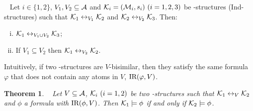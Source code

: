 \documentclass{article}
\newtheorem{theorem}{Theorem}
\begin{document}
\begin{proposition}\label{div}~\cite{renyansfirstpaper}
Let $i\in \{1,2\}$, $V_1,V_2\subseteq\cal A$
and ${\cal K}_i=({\cal M}_i,s_i)~(i=1,2,3)$ be \MPK-structures (Ind-structures)
 such that
${\cal K}_1\leftrightarrow_{V_1}{\cal K}_2$ and ${\cal K}_2\leftrightarrow_{V_2}{\cal K}_3$.
 Then:
 \begin{enumerate}[(i)]
   \item ${\cal K}_1\leftrightarrow_{V_1\cup V_2}{\cal K}_3$;
   \item If $V_1 \subseteq V_2$ then ${\cal K}_1 \leftrightarrow_{V_2} {\cal K}_2$.
 \end{enumerate}
\end{proposition}

Intuitively, if two \MPK-structures are $V$-bisimilar, then they satisfy the same formula $\varphi$ that does not contain any atoms in $V$, \ie $\textrm{IR}(\varphi, V)$.
\begin{theorem}\label{thm:V-bisimulation:EQ}~\cite{renyansfirstpaper}
  Let $V\subseteq\cal A$, ${\cal K}_i~(i=1,2)$ be two \MPK-structures such that
  ${\cal K}_1\leftrightarrow_V{\cal K}_2$ and $\phi$ a formula with $\textrm{IR}(\phi,V)$. Then
  ${\cal K}_1\models\phi$ if and only if ${\cal K}_2\models\phi$.
\end{theorem}
\end{document}

